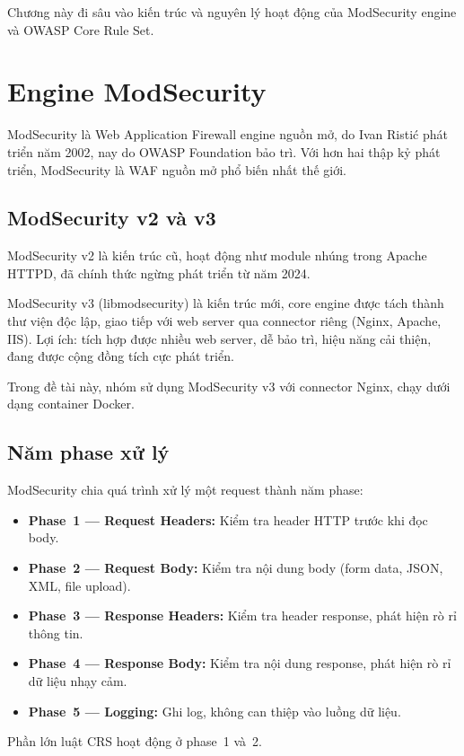 \documentclass[12pt,a4paper,twoside]{report}
\begin{document}
Chương này đi sâu vào kiến trúc và nguyên lý hoạt động của ModSecurity engine và OWASP Core Rule Set.

\section{Engine ModSecurity}

ModSecurity là Web Application Firewall engine nguồn mở, do Ivan Risti\'c phát triển năm 2002, nay do OWASP Foundation bảo trì. Với hơn hai thập kỷ phát triển, ModSecurity là WAF nguồn mở phổ biến nhất thế giới.

\subsection{ModSecurity v2 và v3}

ModSecurity v2 là kiến trúc cũ, hoạt động như module nhúng trong Apache HTTPD, đã chính thức ngừng phát triển từ năm 2024.

ModSecurity v3 (libmodsecurity) là kiến trúc mới, core engine được tách thành thư viện độc lập, giao tiếp với web server qua connector riêng (Nginx, Apache, IIS). Lợi ích: tích hợp được nhiều web server, dễ bảo trì, hiệu năng cải thiện, đang được cộng đồng tích cực phát triển.

Trong đề tài này, nhóm sử dụng ModSecurity v3 với connector Nginx, chạy dưới dạng container Docker.

\subsection{Năm phase xử lý}

ModSecurity chia quá trình xử lý một request thành năm phase:
\begin{itemize}
    \item \textbf{Phase~1 --- Request Headers:} Kiểm tra header HTTP trước khi đọc body.
    \item \textbf{Phase~2 --- Request Body:} Kiểm tra nội dung body (form data, JSON, XML, file upload).
    \item \textbf{Phase~3 --- Response Headers:} Kiểm tra header response, phát hiện rò rỉ thông tin.
    \item \textbf{Phase~4 --- Response Body:} Kiểm tra nội dung response, phát hiện rò rỉ dữ liệu nhạy cảm.
    \item \textbf{Phase~5 --- Logging:} Ghi log, không can thiệp vào luồng dữ liệu.
\end{itemize}
Phần lớn luật CRS hoạt động ở phase~1 và~2.
\end{document}
